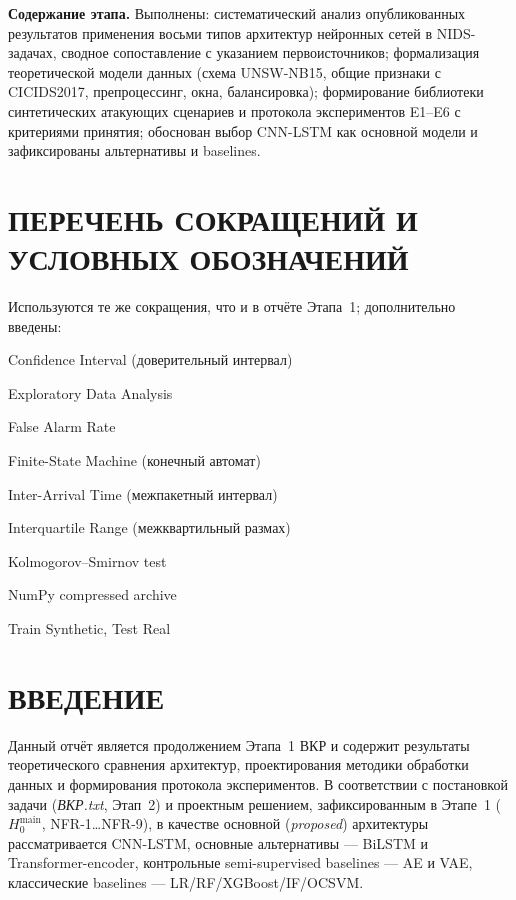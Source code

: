 \documentclass[14pt, a4paper]{extarticle}
\begin{document}
\textbf{Содержание этапа.} Выполнены: систематический анализ
опубликованных результатов применения восьми типов архитектур нейронных
сетей в NIDS-задачах, сводное сопоставление с указанием первоисточников;
формализация теоретической модели данных (схема UNSW-NB15, общие
признаки с CICIDS2017, препроцессинг, окна, балансировка); формирование
библиотеки синтетических атакующих сценариев и протокола экспериментов
E1--E6 с критериями принятия; обоснован выбор CNN-LSTM как основной
модели и зафиксированы альтернативы и baselines.

\newpage

\section*{ПЕРЕЧЕНЬ СОКРАЩЕНИЙ И УСЛОВНЫХ ОБОЗНАЧЕНИЙ}

Используются те же сокращения, что и в отчёте Этапа~1; дополнительно
введены:
\begin{description}[font=\normalfont\bfseries, leftmargin=2.5em]
    \item[CI] Confidence Interval (доверительный интервал)
    \item[EDA] Exploratory Data Analysis
    \item[FAR] False Alarm Rate
    \item[FSM] Finite-State Machine (конечный автомат)
    \item[IAT] Inter-Arrival Time (межпакетный интервал)
    \item[IQR] Interquartile Range (межквартильный размах)
    \item[KS-test] Kolmogorov--Smirnov test
    \item[NPZ] NumPy compressed archive
    \item[TSTR] Train Synthetic, Test Real
\end{description}

\newpage

\tableofcontents
\newpage

\section*{ВВЕДЕНИЕ}

Данный отчёт является продолжением Этапа~1 ВКР и содержит результаты
теоретического сравнения архитектур, проектирования методики обработки
данных и формирования протокола экспериментов. В соответствии с
постановкой задачи (\textit{ВКР.txt}, Этап~2) и проектным решением,
зафиксированным в Этапе~1 (\textit{$H_0^{\text{main}}$}, NFR-1\dots NFR-9),
в качестве основной (\emph{proposed}) архитектуры рассматривается
CNN-LSTM, основные альтернативы --- BiLSTM и Transformer-encoder,
контрольные semi-supervised baselines --- AE и VAE, классические baselines
--- LR/RF/XGBoost/IF/OCSVM.
\end{document}
